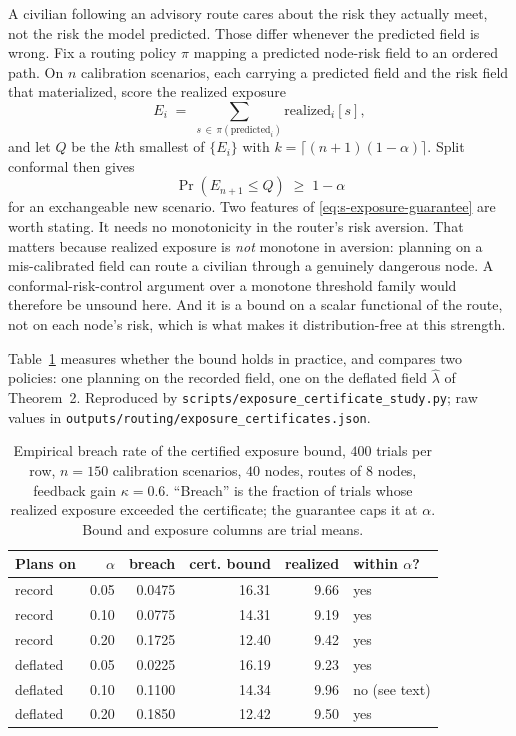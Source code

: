 \documentclass[journal,10pt,onecolumn]{IEEEtran}
\begin{document}
A civilian following an advisory route cares about the risk they actually meet,
not the risk the model predicted. Those differ whenever the predicted field is
wrong. Fix a routing policy $\pi$ mapping a predicted node-risk field to an
ordered path. On $n$ calibration scenarios, each carrying a predicted field and
the risk field that materialized, score the realized exposure
\begin{equation}
\label{eq:s-exposure}
E_i \;=\; \sum_{s \,\in\, \pi(\text{predicted}_i)} \text{realized}_i[s],
\end{equation}
and let $Q$ be the $k$th smallest of $\{E_i\}$ with
$k = \lceil (n+1)(1-\alpha) \rceil$. Split conformal then gives
\begin{equation}
\label{eq:s-exposure-guarantee}
\Pr\!\left(E_{n+1} \le Q\right) \;\ge\; 1 - \alpha
\end{equation}
for an exchangeable new scenario. Two features of \eqref{eq:s-exposure-guarantee}
are worth stating. It needs no monotonicity in the router's risk aversion. That
matters because realized exposure is \emph{not} monotone in aversion: planning on
a mis-calibrated field can route a civilian through a genuinely dangerous node. A
conformal-risk-control argument over a monotone threshold family would therefore be
unsound here. And it is a bound on a scalar functional of the route, not on each
node's risk, which is what makes it distribution-free at this strength.

Table~\ref{tab:s-exposure} measures whether the bound holds in practice, and
compares two policies: one planning on the recorded field, one on the deflated
field $\hat{\lambda}$ of Theorem~2. Reproduced by
\texttt{scripts/exposure\_certificate\_study.py}; raw values in
\texttt{outputs/routing/exposure\_certificates.json}.

\begin{table}[!t]
  \centering
  \caption{Empirical breach rate of the certified exposure bound,
  $400$ trials per row, $n = 150$ calibration scenarios, $40$ nodes, routes of
  $8$ nodes, feedback gain $\kappa = 0.6$. ``Breach'' is the fraction of trials
  whose realized exposure exceeded the certificate; the guarantee caps it at
  $\alpha$. Bound and exposure columns are trial means.}
  \label{tab:s-exposure}
  \begin{tabular}{l r r r r l}
    \toprule
    \textbf{Plans on} & $\alpha$ & \textbf{breach}
    & \textbf{cert. bound} & \textbf{realized} & \textbf{within $\alpha$?} \\
    \midrule
    record   & 0.05 & 0.0475 & 16.31 & 9.66 & yes \\
    record   & 0.10 & 0.0775 & 14.31 & 9.19 & yes \\
    record   & 0.20 & 0.1725 & 12.40 & 9.42 & yes \\
    \addlinespace
    deflated & 0.05 & 0.0225 & 16.19 & 9.23 & yes \\
    deflated & 0.10 & 0.1100 & 14.34 & 9.96 & no (see text) \\
    deflated & 0.20 & 0.1850 & 12.42 & 9.50 & yes \\
    \bottomrule
  \end{tabular}
\end{table}
\end{document}
